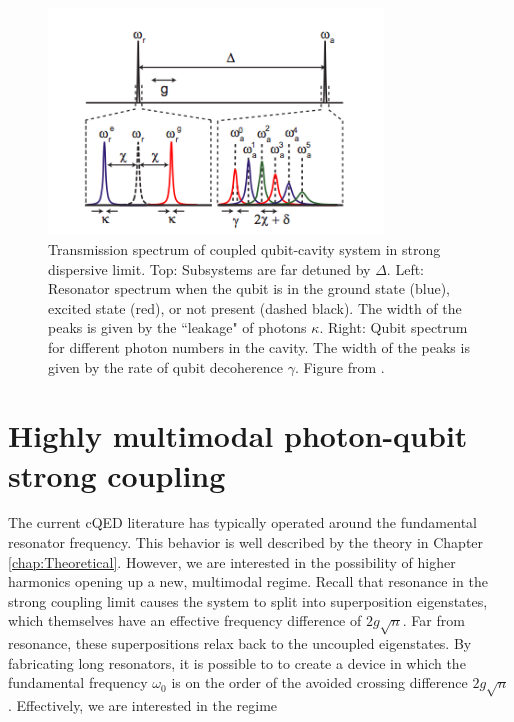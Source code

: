 \documentclass[11 pt, oneside]{book} %
\begin{document}
\begin{figure}[h] 
   \centering
   \includegraphics[width=3.5in]{SchusterDispersiveFrequencyShifts.png} 
   \caption[Transmission spectrum of coupled system in strong dispersive limit]{Transmission spectrum of coupled qubit-cavity system in strong dispersive limit. Top: Subsystems are far detuned by $\Delta$. Left: Resonator spectrum when the qubit is in the ground state (blue), excited state (red), or not present (dashed black). The width of the peaks is given by the ``leakage" of photons $\kappa$. Right: Qubit spectrum for different photon numbers in the cavity. The width of the peaks is given by the rate of qubit decoherence $\gamma$. Figure from \cite{Schuster}.}
   \label{fig:DispersiveFrequencyShifts}
\end{figure}

\chapter{Highly multimodal photon-qubit strong coupling}\label{chap:Multimodal}

The current cQED literature has typically operated around the fundamental resonator frequency. This behavior is well described by the theory in Chapter \ref{chap:Theoretical}. However, we are interested in the possibility of higher harmonics opening up a new, multimodal regime. Recall that resonance in the strong coupling limit causes the system to split into superposition eigenstates, which themselves have an effective frequency difference of $2g\sqrt{n}$. Far from resonance, these superpositions relax back to the uncoupled eigenstates. By fabricating long resonators, it is possible to to create a device in which the fundamental frequency $\omega_0$ is on the order of the avoided crossing difference $2g\sqrt{n}$. Effectively, we are interested in the regime
\end{document}
